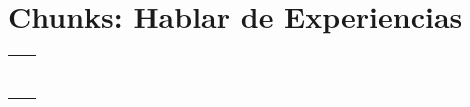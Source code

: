 \documentclass[12pt,a4paper]{article}
\begin{document}
\section{Chunks: Hablar de Experiencias}

\begin{cajachunk}
\begin{tabularx}{\textwidth}{@{} X l @{}}
\eng{I have been to \underline{\hspace{2cm}}.} & \esp{He estado en \underline{\hspace{2cm}}.} \\
\eng{Have you ever \underline{\hspace{2cm}}?} & \esp{¿Alguna vez has \underline{\hspace{2cm}}?} \\
\eng{I have never tried \underline{\hspace{2cm}}.} & \esp{Nunca he probado \underline{\hspace{2cm}}.} \\
\eng{She has already \underline{\hspace{2cm}}.} & \esp{Ella ya ha \underline{\hspace{2cm}}.} \\
\eng{We haven't \underline{\hspace{2cm}} yet.} & \esp{Todavía no hemos \underline{\hspace{2cm}}.} \\
\eng{How long have you \underline{\hspace{2cm}}?} & \esp{¿Cuánto tiempo llevas \underline{\hspace{2cm}}?} \\
\eng{I've lived here since \underline{\hspace{2cm}}.} & \esp{Vivo aquí desde \underline{\hspace{2cm}}.} \\
\eng{I've known him for \underline{\hspace{2cm}}.} & \esp{Lo conozco desde hace \underline{\hspace{2cm}}.} \\
\end{tabularx}
\end{cajachunk}
\end{document}
